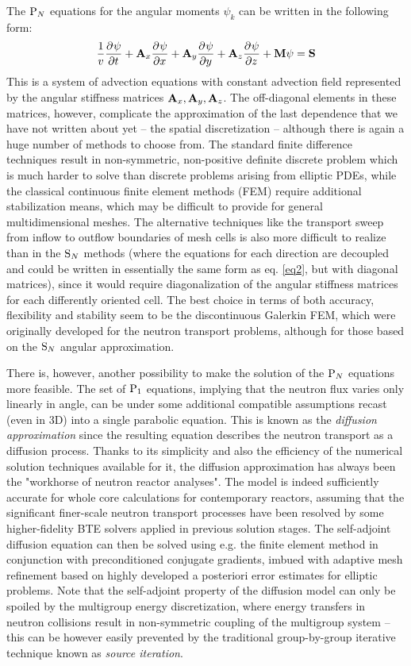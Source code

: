 The $\PN$ equations for the angular moments $\psi_k$ can be written in the following form:
\begin{equation}\label{eq2}
  \frac1v \pd{\psi}{t} + \AA_x\pd{\psi}{x} + \AA_y\pd{\psi}{y} + \AA_z\pd{\psi}{z} + \MM\psi = \SS
\end{equation}
This is a system of advection equations with constant advection field represented by the angular stiffness matrices $\AA_x, \AA_y, \AA_z$. The off-diagonal elements in these matrices, however, complicate the approximation of the last dependence that we have not written about yet -- the spatial discretization -- although there is again a huge number of methods to choose from. The standard finite difference techniques result in non-symmetric, non-positive definite discrete problem which is much harder to solve than discrete problems arising from elliptic PDEs, while the classical continuous finite element methods (FEM) require additional stabilization means, which may be difficult to provide for general multidimensional meshes. The alternative techniques like the transport sweep from inflow to outflow boundaries of mesh cells is also more difficult to realize than in the $\SN$ methods (where the equations for each direction are decoupled and could be written in essentially the same form as eq. \eqref{eq2}, but with diagonal matrices), since it would require diagonalization of the angular stiffness matrices for each differently oriented cell. The best choice in terms of both accuracy, flexibility and stability seem to be the discontinuous Galerkin FEM, which were originally developed for the neutron transport problems, although for those based on the $\SN$ angular approximation. 

There is, however, another possibility to make the solution of the $\PN$ equations more feasible. The set of $\PN[1]$ equations, implying that the neutron flux varies only linearly in angle, can be under some additional compatible assumptions recast (even in 3D) into a single parabolic equation. This is known as the \textit{diffusion approximation} since the resulting equation describes the neutron transport as a diffusion process. Thanks to its simplicity and also the efficiency of the numerical solution techniques available for it, the diffusion approximation has always been the "workhorse of neutron reactor analyses". The model is indeed sufficiently accurate for whole core calculations for contemporary reactors, assuming that the significant finer-scale neutron transport processes have been resolved by some higher-fidelity BTE solvers applied in previous solution stages. The self-adjoint diffusion equation can then be solved using e.g. the finite element method in conjunction with preconditioned conjugate gradients, imbued with adaptive mesh refinement based on highly developed a posteriori error estimates for elliptic problems. Note that the self-adjoint property of the diffusion model can only be spoiled by the multigroup energy discretization, where energy transfers in neutron collisions result in non-symmetric coupling of the multigroup system -- this can be however easily prevented by the traditional group-by-group iterative technique known as \textit{source iteration}.

